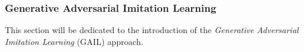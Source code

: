 \subsubsection{Generative Adversarial Imitation Learning}
\label{sec:gail}
This section will be dedicated to the introduction of the \textit{Generative Adversarial Imitation Learning} (GAIL) approach. 
